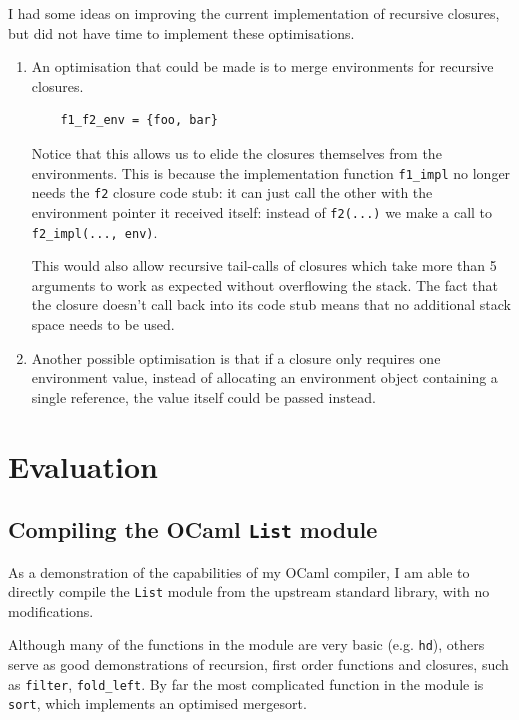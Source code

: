 \documentclass[12pt,a4paper,twoside,openright]{report}
\begin{document}
I had some ideas on improving the current implementation of recursive closures,
but did not have time to implement these optimisations.

\begin{enumerate}
  \item An optimisation that could be made is to merge environments for recursive closures.
    \begin{lstlisting}
    f1_f2_env = {foo, bar}\end{lstlisting}
    Notice that this allows us to elide the closures themselves from the environments.
    This is because the implementation function \lstinline!f1_impl! no longer needs
    the \lstinline!f2! closure code stub: it can just call
    the other with the environment pointer it received itself:
    instead of \lstinline!f2(...)! we make a call to \lstinline!f2_impl(..., env)!.

    This would also allow recursive tail-calls of closures which take more
    than 5 arguments to work as expected without overflowing the stack. The
    fact that the closure doesn't
    call back into its code stub means that no additional stack space needs
    to be used.

  \item Another possible optimisation is that if a closure only requires one
    environment value, instead of allocating an environment object containing a
    single reference, the value itself could be passed instead.
\end{enumerate}



\chapter{Evaluation}

\section{Compiling the OCaml \texttt{List} module}\label{module-list}

As a demonstration of the capabilities of my OCaml compiler, I am able to
directly compile the \lstinline!List! module from the upstream standard
library, with no modifications.

Although many of the functions in the module are very basic (e.g.
\lstinline!hd!), others serve as good demonstrations of recursion, first order
functions and closures, such as \lstinline!filter!, \lstinline!fold_left!. By
far the most complicated function in the module is \lstinline!sort!, which
implements an optimised mergesort.
\end{document}

